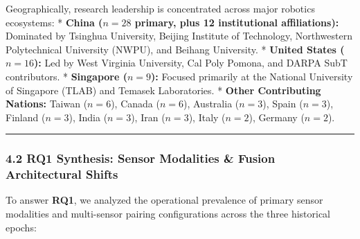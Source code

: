 \documentclass[journal]{IEEEtran}
\begin{document}
Geographically, research leadership is concentrated across major
robotics ecosystems: * \textbf{China (\(n = 28\) primary, plus 12
institutional affiliations):} Dominated by Tsinghua University, Beijing
Institute of Technology, Northwestern Polytechnical University (NWPU),
and Beihang University. * \textbf{United States (\(n = 16\)):} Led by
West Virginia University, Cal Poly Pomona, and DARPA SubT contributors.
* \textbf{Singapore (\(n = 9\)):} Focused primarily at the National
University of Singapore (TLAB) and Temasek Laboratories. * \textbf{Other
Contributing Nations:} Taiwan (\(n = 6\)), Canada (\(n = 6\)), Australia
(\(n = 3\)), Spain (\(n = 3\)), Finland (\(n = 3\)), India (\(n = 3\)),
Iran (\(n = 3\)), Italy (\(n = 2\)), Germany (\(n = 2\)).

\begin{center}\rule{0.5\linewidth}{0.5pt}\end{center}

\subsubsection{4.2 RQ1 Synthesis: Sensor Modalities \& Fusion
Architectural
Shifts}\label{rq1-synthesis-sensor-modalities-fusion-architectural-shifts}

To answer \textbf{RQ1}, we analyzed the operational prevalence of
primary sensor modalities and multi-sensor pairing configurations across
the three historical epochs:
\end{document}
